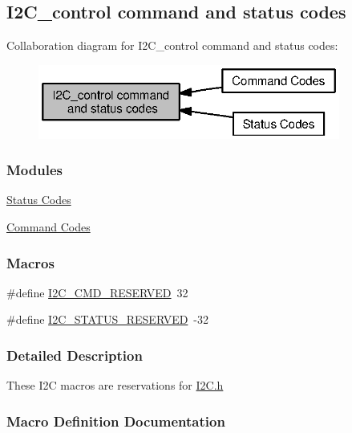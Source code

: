 \subsection{I2\+C\+\_\+control command and status codes}
\label{group___i2_c___c_o_n_t_r_o_l}
Collaboration diagram for I2\+C\+\_\+control command and status codes\+:
\nopagebreak
\begin{figure}[H]
\begin{center}
\leavevmode
\includegraphics[width=281pt]{group___i2_c___c_o_n_t_r_o_l}
\end{center}
\end{figure}
\subsubsection*{Modules}
\begin{DoxyCompactItemize}
\item 
\hyperlink{group___i2_c___s_t_a_t_u_s}{Status Codes}
\item 
\hyperlink{group___i2_c___c_m_d}{Command Codes}
\end{DoxyCompactItemize}
\subsubsection*{Macros}
\begin{DoxyCompactItemize}
\item 
\#define \hyperlink{group___i2_c___c_o_n_t_r_o_l_ga760ec0a6fdb876ccc67b6f06301d53ec}{I2\+C\+\_\+\+C\+M\+D\+\_\+\+R\+E\+S\+E\+R\+V\+E\+D}~32
\item 
\#define \hyperlink{group___i2_c___c_o_n_t_r_o_l_gacfd04572fe349d087c2547501cbc7e0a}{I2\+C\+\_\+\+S\+T\+A\+T\+U\+S\+\_\+\+R\+E\+S\+E\+R\+V\+E\+D}~-\/32
\end{DoxyCompactItemize}


\subsubsection{Detailed Description}
These I2\+C macros are reservations for \hyperlink{_i2_c_8h}{I2\+C.\+h} 

\subsubsection{Macro Definition Documentation}
